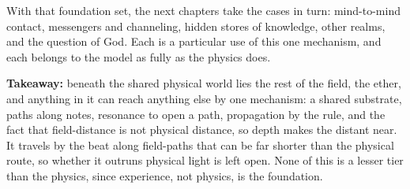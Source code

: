 With that foundation set, the next chapters take the cases in turn: mind-to-mind contact, messengers and channeling, hidden stores of knowledge, other realms, and the question of God. Each is a particular use of this one mechanism, and each belongs to the model as fully as the physics does.

\textbf{Takeaway:} beneath the shared physical world lies the rest of the field, the ether, and anything in it can reach anything else by one mechanism: a shared substrate, paths along notes, resonance to open a path, propagation by the rule, and the fact that field-distance is not physical distance, so depth makes the distant near. It travels by the beat along field-paths that can be far shorter than the physical route, so whether it outruns physical light is left open. None of this is a lesser tier than the physics, since experience, not physics, is the foundation.

